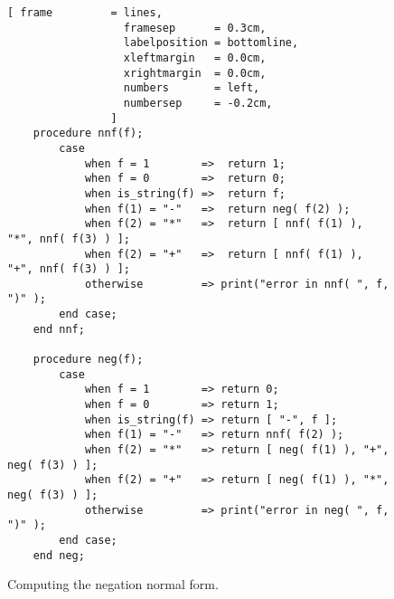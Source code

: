 \begin{figure}[!ht]
  \centering
\begin{Verbatim}[ frame         = lines, 
                  framesep      = 0.3cm, 
                  labelposition = bottomline,
                  xleftmargin   = 0.0cm,
                  xrightmargin  = 0.0cm,
                  numbers       = left,
                  numbersep     = -0.2cm,
                ]
    procedure nnf(f);
        case
            when f = 1        =>  return 1;
            when f = 0        =>  return 0;
            when is_string(f) =>  return f;
            when f(1) = "-"   =>  return neg( f(2) );
            when f(2) = "*"   =>  return [ nnf( f(1) ), "*", nnf( f(3) ) ];
            when f(2) = "+"   =>  return [ nnf( f(1) ), "+", nnf( f(3) ) ];
            otherwise         => print("error in nnf( ", f, ")" );
        end case;
    end nnf;

    procedure neg(f);
        case
            when f = 1        => return 0;
            when f = 0        => return 1;
            when is_string(f) => return [ "-", f ];
            when f(1) = "-"   => return nnf( f(2) );
            when f(2) = "*"   => return [ neg( f(1) ), "+", neg( f(3) ) ];
            when f(2) = "+"   => return [ neg( f(1) ), "*", neg( f(3) ) ];
            otherwise         => print("error in neg( ", f, ")" );
        end case;
    end neg;
\end{Verbatim}
\vspace*{-0.3cm}
  \caption{Computing the negation normal form.}
  \label{fig:nnf}
\end{figure}


